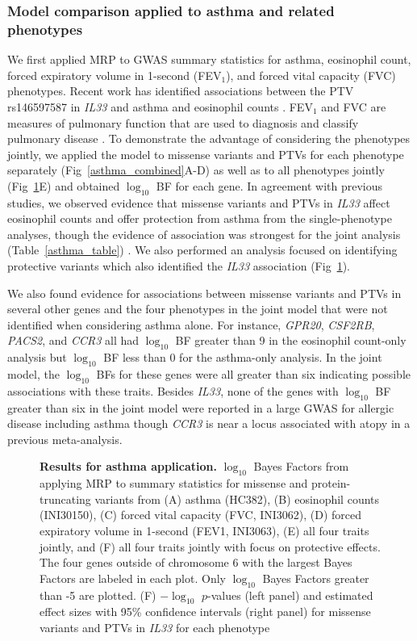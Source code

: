 \subsubsection*{Model comparison applied to asthma and related phenotypes}
We first applied MRP to GWAS summary statistics for asthma, eosinophil count, forced expiratory volume in 1-second (FEV$_1$), and forced vital capacity (FVC) phenotypes. Recent work has identified associations between the PTV rs146597587 in \textit{IL33} and asthma and eosinophil counts \cite{DeBoever179762, 10.1371/journal.pgen.1006659}. FEV$_1$ and FVC are measures of pulmonary function that are used to diagnosis and classify pulmonary disease \cite{Swanney1046}. To demonstrate the advantage of considering the phenotypes jointly, we applied the model to missense variants and PTVs for each phenotype separately (Fig~\ref{asthma_combined}A-D) as well as to all phenotypes jointly (Fig~\ref{fig3}E) and obtained $\log_{10}$ BF for each gene. In agreement with previous studies, we observed evidence that missense variants and PTVs in \textit{IL33} affect eosinophil counts and offer protection from asthma from the single-phenotype analyses, though the evidence of association was strongest for the joint analysis (Table~\ref{asthma_table}) \cite{DeBoever179762, 10.1371/journal.pgen.1006659}. We also performed an analysis focused on identifying protective variants which also identified the \textit{IL33} association (Fig~\ref{fig3}).

We also found evidence for associations between missense variants and PTVs in several other genes and the four phenotypes in the joint model that were not identified when considering asthma alone. For instance, \textit{GPR20}, \textit{CSF2RB}, \textit{PACS2}, and \textit{CCR3} all had $\log_{10}$ BF greater than 9 in the eosinophil count-only analysis but $\log_{10}$ BF less than 0 for the asthma-only analysis. In the joint model, the $\log_{10}$ BFs for these genes were all greater than six indicating possible associations with these traits. Besides \textit{IL33}, none of the genes with $\log_{10}$ BF greater than six in the joint model were reported in a large GWAS for allergic disease including asthma\cite{Ferreira:2017ba} though \textit{CCR3} is near a locus associated with atopy in a previous meta-analysis\cite{Ober:2011jk}. 

\begin{figure}[!h]
\caption{{\bf Results for asthma application.}
$\log_{10}$ Bayes Factors from applying MRP to summary statistics for missense and protein-truncating variants from (A) asthma (HC382), (B) eosinophil counts (INI30150), (C) forced vital capacity (FVC, INI3062), (D) forced expiratory volume in 1-second (FEV1, INI3063), (E) all four traits jointly, and (F) all four traits jointly with focus on protective effects. The four genes outside of chromosome 6 with the largest Bayes Factors are labeled in each plot. Only $\log_{10}$ Bayes Factors greater than -5 are plotted. (F) $-\log_{10}$ $p$-values (left panel) and estimated effect sizes with 95\% confidence intervals (right panel) for missense variants and PTVs in \textit{IL33} for each phenotype}
\label{fig3}
\end{figure}

